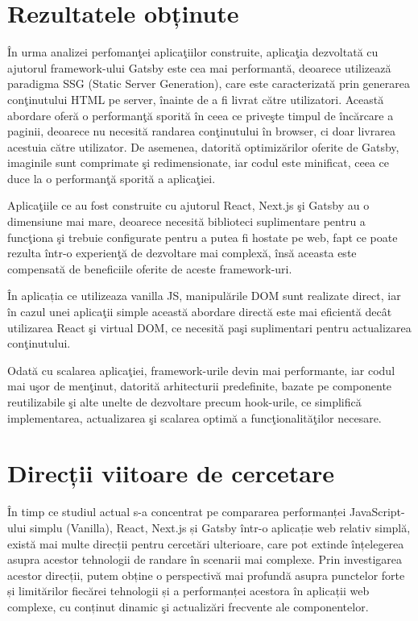\documentclass[12pt, a4paper]{report}
\begin{document}
\section{Rezultatele obținute}

\^In urma analizei perfoman\c tei aplica\c tiilor construite, aplica\c tia dezvoltată cu ajutorul framework-ului Gatsby este cea mai performant\u a, deoarece utilizeaz\u a paradigma SSG (Static Server Generation), care este caracterizat\u a prin generarea con\c tinutului HTML pe server, \^inainte de a fi livrat c\u atre utilizatori. Aceast\u a abordare ofer\u a o performan\c t\u a sporită \^in ceea ce prive\c ste timpul de \^inc\u arcare a paginii, deoarece nu necesit\u a randarea con\c tinutului \^in browser, ci doar livrarea acestuia c\u atre utilizator. De asemenea, datorit\u a optimiz\u arilor oferite de Gatsby, imaginile sunt comprimate \c si redimensionate, iar codul este minificat, ceea ce duce la o performan\c t\u a sporit\u a a aplica\c tiei.

Aplica\c tiile ce au fost construite cu ajutorul React, Next.js \c si Gatsby au o dimensiune mai mare, deoarece necesit\u a biblioteci suplimentare pentru a func\c tiona \c si trebuie configurate pentru a putea fi hostate pe web, fapt ce poate rezulta \^intr-o experien\c t\u a de dezvoltare mai complex\u a, \^ins\u a aceasta este compensat\u a de beneficiile oferite de aceste framework-uri.

\^In aplicația ce utilizeaza vanilla JS, manipul\u arile DOM sunt realizate direct, iar \^in cazul unei aplica\c tii simple aceast\u a abordare direct\u a este mai eficient\u a dec\^at utilizarea React \c si virtual DOM, ce necesit\u a pa\c si suplimentari pentru actualizarea con\c tinutului.

Odată cu scalarea aplica\c tiei, framework-urile devin mai performante, iar codul mai u\c sor de men\c tinut, datorit\u a arhitecturii predefinite, bazate pe componente reutilizabile \c si alte unelte de dezvoltare precum hook-urile, ce simplifică implementarea, actualizarea \c si scalarea optim\u a a func\c tionalit\u a\c tilor necesare.

\section {Direcții viitoare de cercetare}

În timp ce studiul actual s-a concentrat pe compararea performanței JavaScript-ului simplu (Vanilla), React, Next.js și Gatsby într-o aplicație web relativ simplă, există mai multe direcții pentru cercet\u ari ulterioare, care pot extinde înțelegerea asupra acestor tehnologii de randare în scenarii mai complexe. Prin investigarea acestor direcții, putem obține o perspectivă mai profundă asupra punctelor forte și limitărilor fiecărei tehnologii și a performanței acestora în aplicații web complexe, cu conținut dinamic \c si actualiz\u ari frecvente ale componentelor.
\end{document}
